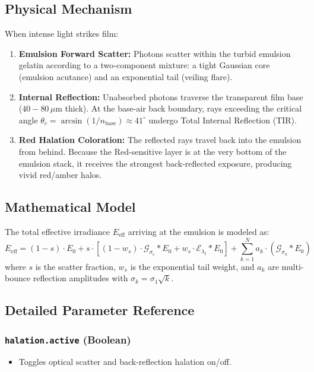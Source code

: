 \documentclass[11pt,a4paper]{article}
\begin{document}
\subsection{Physical Mechanism}
When intense light strikes film:
\begin{enumerate}[leftmargin=*]
    \item \textbf{Emulsion Forward Scatter:} Photons scatter within the turbid emulsion gelatin according to a two-component mixture: a tight Gaussian core (emulsion acutance) and an exponential tail (veiling flare).
    \item \textbf{Internal Reflection:} Unabsorbed photons traverse the transparent film base ($40 - 80\,\mu\text{m}$ thick). At the base-air back boundary, rays exceeding the critical angle $\theta_c = \arcsin(1/n_{\text{base}}) \approx 41^\circ$ undergo Total Internal Reflection (TIR).
    \item \textbf{Red Halation Coloration:} The reflected rays travel back into the emulsion from behind. Because the Red-sensitive layer is at the very bottom of the emulsion stack, it receives the strongest back-reflected exposure, producing vivid red/amber halos.
\end{enumerate}

\subsection{Mathematical Model}
The total effective irradiance $E_{\text{eff}}$ arriving at the emulsion is modeled as:
\begin{equation}
E_{\text{eff}} = (1 - s) \cdot E_0 + s \cdot \left[ (1 - w_s) \cdot \mathcal{G}_{\sigma_c} * E_0 + w_s \cdot \mathcal{E}_{\lambda_t} * E_0 \right] + \sum_{k=1}^N a_k \cdot \left(\mathcal{G}_{\sigma_k} * E_0\right)
\end{equation}
where $s$ is the scatter fraction, $w_s$ is the exponential tail weight, and $a_k$ are multi-bounce reflection amplitudes with $\sigma_k = \sigma_1 \sqrt{k}$.

\subsection{Detailed Parameter Reference}

\subsubsection{\texttt{halation.active} (Boolean)}
\begin{itemize}[leftmargin=*]
    \item Toggles optical scatter and back-reflection halation on/off.
\end{itemize}
\end{document}
